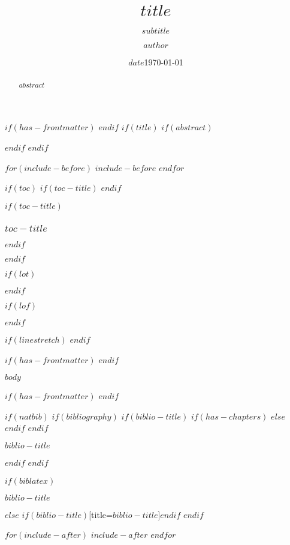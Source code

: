 \documentclass[
$if(fontsize)$
  $fontsize$,
$endif$
$if(papersize)$
  $papersize$paper,
$endif$
  ignorenonframetext,
$if(handout)$
  handout,
$endif$
$if(aspectratio)$
  aspectratio=$aspectratio$,
$endif$
$for(classoption)$
  $classoption$$sep$,
$endfor$
xcolor={table},]{beamer}
\title{$title$}
\author{$author$}
\subtitle{$subtitle$}
\date{$date$}
\date{\today}
\newif\ifbibliography
\begin{document}
$if(has-frontmatter)$
\frontmatter
$endif$
$if(title)$
\frame{\titlepage}
$if(abstract)$
\begin{abstract}
$abstract$
\end{abstract}
$endif$
$endif$

$for(include-before)$
$include-before$
$endfor$

$if(toc)$
$if(toc-title)$
\renewcommand*\contentsname{$toc-title$}
$endif$
\begin{frame}[allowframebreaks]
$if(toc-title)$
  \frametitle{$toc-title$}
$endif$
  \tableofcontents[hideallsubsections]
\end{frame}
$endif$

$if(lot)$
\listoftables
$endif$

$if(lof)$
\listoffigures
$endif$

$if(linestretch)$
$endif$

$if(has-frontmatter)$
\mainmatter
$endif$

$body$

$if(has-frontmatter)$
\backmatter
$endif$

$if(natbib)$
$if(bibliography)$
$if(biblio-title)$
$if(has-chapters)$
\renewcommand\bibname{$biblio-title$}
$else$
\renewcommand\refname{$biblio-title$}
$endif$
$endif$
\begin{frame}[allowframebreaks]{$biblio-title$}
  \bibliographytrue
  
\end{frame}

$endif$
$endif$

$if(biblatex)$
\begin{frame}[allowframebreaks]{$biblio-title$}
  \bibliographytrue
  \printbibliography[heading=none]
\end{frame}
$else$
\printbibliography$if(biblio-title)$[title=$biblio-title$]$endif$
$endif$

$for(include-after)$
$include-after$
$endfor$
\end{document}
